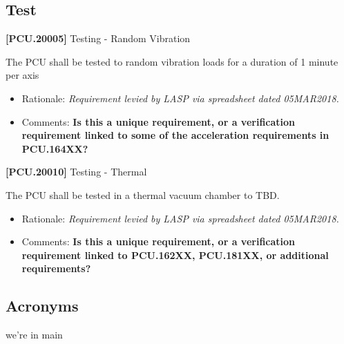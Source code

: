 \documentclass[12pt,oneside,oldfontcommands]{memoir}
\def\bibliostyle{plain}
\begin{document}
\section{Test}
\label{test}

\textbf{[PCU.20005]} Testing - Random Vibration

The \gls{PCU} shall be tested to random vibration loads for a duration of 1 minute per axis

\begin{itemize}
\item{} Rationale: \emph{Requirement levied by LASP via spreadsheet dated 05MAR2018.}

\item{} Comments: \textbf{Is this a unique requirement, or a verification requirement linked to some of the acceleration requirements in PCU.164XX?}

\end{itemize}

\textbf{[PCU.20010]} Testing - Thermal

The \gls{PCU} shall be tested in a thermal vacuum chamber to TBD\label{tbx_15}.

\begin{itemize}
\item{} Rationale: \emph{Requirement levied by LASP via spreadsheet dated 05MAR2018.}

\item{} Comments: \textbf{Is this a unique requirement, or a verification requirement linked to PCU.162XX, PCU.181XX, or additional requirements?}

\end{itemize}


\begin{appendices}


\chapter{Acronyms  }
\label{sec_acros}

\printglossary[type=\acronymtype]

\end{appendices}

% 
%
%


\if@mainmatter
	we're in main
	\backmatter
\fi



\ifx\bibliocommand\undefined
\else
	
	\bibliocommand
\fi






\end{document}
